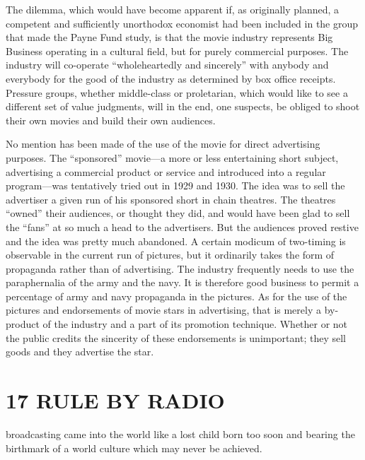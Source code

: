 \documentclass[openany,nobib]{tufte-book}
\let\oldchapter\chapter
\def\chapter{%
  \setcounter{footnote}{0}%
  \oldchapter
}
\begin{document}
The dilemma, which would have become apparent if, as originally planned,
a competent and sufficiently unorthodox economist had been included in
the group that made the Payne Fund study, is that the movie industry
represents Big Business operating in a cultural field, but for purely
commercial purposes. The industry will co-operate ``wholeheartedly and
sincerely'' with anybody and everybody for the good of the industry as
determined by box office receipts. Pressure groups, whether middle-class
or proletarian, which would like to see a different set of value
judgments, will in the end, one suspects, be obliged to shoot their own
movies and build their own audiences.

No mention has been made of the use of the movie for direct advertising
purposes. The ``sponsored'' movie---a more or less entertaining short
subject, advertising a commercial product or service and introduced into
a regular program---was tentatively tried out in 1929 and 1930. The idea
was to sell the advertiser a given run of his sponsored short in chain
theatres. The theatres ``owned'' their audiences, or thought they did,
and would have been glad to sell the ``fans'' at so much a head to the
advertisers. But the audiences proved restive and the idea was pretty
much abandoned. A certain modicum of two-timing is observable in the
current run of pictures, but it ordinarily takes the form of propaganda
rather than of advertising. The industry frequently needs to use the
paraphernalia of the army and the navy. It is therefore good business to
permit a percentage of army and navy propaganda in the pictures. As for
the use of the pictures and endorsements of movie stars in advertising,
that is merely a by-product of the industry and a part of its promotion
technique. Whether or not the public credits the sincerity of these
endorsements is unimportant; they sell goods and they advertise the
star.



\chapter[17 \hspace*{1mm} RULE BY RADIO]{17 RULE BY RADIO}


 broadcasting came into the world like a lost child born too soon
and bearing the birthmark of a world culture which may never be
achieved.
\end{document}
